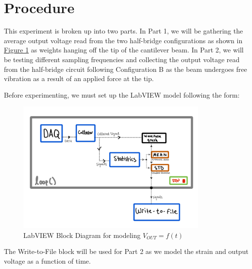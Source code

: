 \documentclass{article}
\begin{document}
\section{Procedure}
This experiment is broken up into two parts. In Part 1, we will be gathering the average output voltage read from the two half-bridge configurations as shown in \hyperlink{fig1}{Figure 1} as weights hanging off the tip of the cantilever beam. In Part 2, we will be testing different sampling frequencies and collecting the output voltage read from the half-bridge circuit following Configuration B as the beam undergoes free vibration as a result of an applied force at the tip. 
\vspace{2.5mm}

Before experimenting, we must set up the LabVIEW model following the form:

\begin{center}
\end{center}

\begin{figure}[H]
    \centering
    \includegraphics[width = 0.85\textwidth]{lab5images/labview_blockdiagram.png}
    \caption{LabVIEW Block Diagram for modeling $V_{OUT}=f(t)$}
\end{figure}

The Write-to-File block will be used for Part 2 as we model the strain and output voltage as a function of time.
\end{document}
